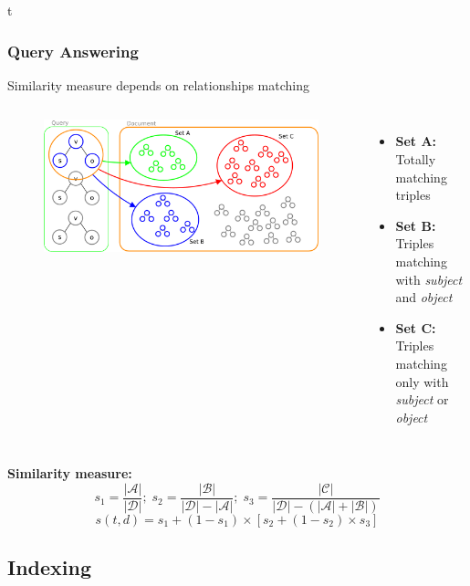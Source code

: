 \documentclass{beamer}
\begin{document}
\begin{frame}{t}
\frametitle{Query Answering}
Similarity measure depends on relationships matching
\bigskip
\begin{columns}[T]
\begin{figure}
\includegraphics[scale=0.2]{imgs/sets}
\end{figure}
\begin{itemize}
\item {\bfseries{Set A:\\}} Totally matching triples
\item {\bfseries{Set B:\\}} Triples matching with \emph{subject} and \emph{object}
\item {\bfseries{Set C:\\}} Triples matching only with \emph{subject} or \emph{object}
\end{itemize}
\end{columns}
\bigskip
\vspace{1mm}
{\color{red}\bfseries{Similarity measure:}}
\tiny
$$
s_{1} = \frac{|\mathcal{A}|}{|\mathcal{D}|};\;
s_{2} = \frac{|\mathcal{B}|}{|\mathcal{D}| - |\mathcal{A}|};\;
s_{3} = \frac{|\mathcal{C}|}{|\mathcal{D}|-(|\mathcal{A}|+|\mathcal{B}|)}
$$
\small
$$
s (t, d) = s_{1} + (1 - s_{1}) \times
[s_{2} + (1 - s_{2}) \times s_{3}]
$$
\bigskip
\end{frame}

\subsection{Indexing}
\end{document}
